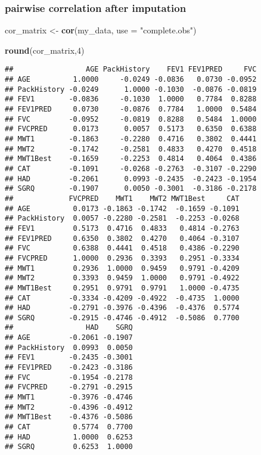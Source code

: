 \documentclass[
]{article}
\newenvironment{Shaded}{\begin{snugshade}}{\end{snugshade}}
\newcommand{\AttributeTok}[1]{\textcolor[rgb]{0.13,0.29,0.53}{#1}}
\newcommand{\DecValTok}[1]{\textcolor[rgb]{0.00,0.00,0.81}{#1}}
\newcommand{\FunctionTok}[1]{\textcolor[rgb]{0.13,0.29,0.53}{\textbf{#1}}}
\newcommand{\NormalTok}[1]{#1}
\newcommand{\OtherTok}[1]{\textcolor[rgb]{0.56,0.35,0.01}{#1}}
\newcommand{\StringTok}[1]{\textcolor[rgb]{0.31,0.60,0.02}{#1}}
\begin{document}
\subsubsection{pairwise correlation after
imputation}\label{pairwise-correlation-after-imputation}

\begin{Shaded}
\begin{Highlighting}[]
\NormalTok{cor\_matrix }\OtherTok{\textless{}{-}} \FunctionTok{cor}\NormalTok{(my\_data, }\AttributeTok{use =} \StringTok{"complete.obs"}\NormalTok{)}

\FunctionTok{round}\NormalTok{(cor\_matrix,}\DecValTok{4}\NormalTok{)}
\end{Highlighting}
\end{Shaded}

\begin{verbatim}
##                 AGE PackHistory    FEV1 FEV1PRED     FVC
## AGE          1.0000     -0.0249 -0.0836   0.0730 -0.0952
## PackHistory -0.0249      1.0000 -0.1030  -0.0876 -0.0819
## FEV1        -0.0836     -0.1030  1.0000   0.7784  0.8288
## FEV1PRED     0.0730     -0.0876  0.7784   1.0000  0.5484
## FVC         -0.0952     -0.0819  0.8288   0.5484  1.0000
## FVCPRED      0.0173      0.0057  0.5173   0.6350  0.6388
## MWT1        -0.1863     -0.2280  0.4716   0.3802  0.4441
## MWT2        -0.1742     -0.2581  0.4833   0.4270  0.4518
## MWT1Best    -0.1659     -0.2253  0.4814   0.4064  0.4386
## CAT         -0.1091     -0.0268 -0.2763  -0.3107 -0.2290
## HAD         -0.2061      0.0993 -0.2435  -0.2423 -0.1954
## SGRQ        -0.1907      0.0050 -0.3001  -0.3186 -0.2178
##             FVCPRED    MWT1    MWT2 MWT1Best     CAT
## AGE          0.0173 -0.1863 -0.1742  -0.1659 -0.1091
## PackHistory  0.0057 -0.2280 -0.2581  -0.2253 -0.0268
## FEV1         0.5173  0.4716  0.4833   0.4814 -0.2763
## FEV1PRED     0.6350  0.3802  0.4270   0.4064 -0.3107
## FVC          0.6388  0.4441  0.4518   0.4386 -0.2290
## FVCPRED      1.0000  0.2936  0.3393   0.2951 -0.3334
## MWT1         0.2936  1.0000  0.9459   0.9791 -0.4209
## MWT2         0.3393  0.9459  1.0000   0.9791 -0.4922
## MWT1Best     0.2951  0.9791  0.9791   1.0000 -0.4735
## CAT         -0.3334 -0.4209 -0.4922  -0.4735  1.0000
## HAD         -0.2791 -0.3976 -0.4396  -0.4376  0.5774
## SGRQ        -0.2915 -0.4746 -0.4912  -0.5086  0.7700
##                 HAD    SGRQ
## AGE         -0.2061 -0.1907
## PackHistory  0.0993  0.0050
## FEV1        -0.2435 -0.3001
## FEV1PRED    -0.2423 -0.3186
## FVC         -0.1954 -0.2178
## FVCPRED     -0.2791 -0.2915
## MWT1        -0.3976 -0.4746
## MWT2        -0.4396 -0.4912
## MWT1Best    -0.4376 -0.5086
## CAT          0.5774  0.7700
## HAD          1.0000  0.6253
## SGRQ         0.6253  1.0000
\end{verbatim}
\end{document}
